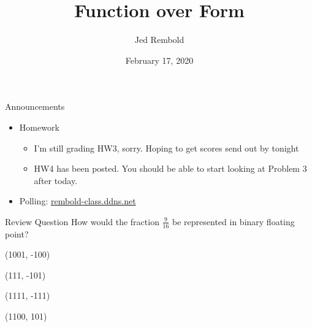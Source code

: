 \documentclass[pdf, aspectratio=169, 12pt]{beamer}
\title{Function over Form}
\author{Jed Rembold}
\date{February 17, 2020}
\begin{document}
\begin{frame}{Announcements}
	\begin{itemize}
		\item Homework
			\begin{itemize}
				\item I'm still grading HW3, sorry. Hoping to get scores send out by tonight
				\item HW4 has been posted. You should be able to start looking at Problem 3 after today.
			\end{itemize}
		\item Polling: \url{rembold-class.ddns.net}
	\end{itemize}
\end{frame}

\begin{frame}{Review Question}
	How would the fraction $\tfrac{9}{16}$ be represented in binary floating point?
	\begin{poll}
	\item (1001, -100)
	\item (111, -101)
	\item (1111, -111)
	\item (1100, 101)
	\end{poll}
\end{frame}

\end{document}
